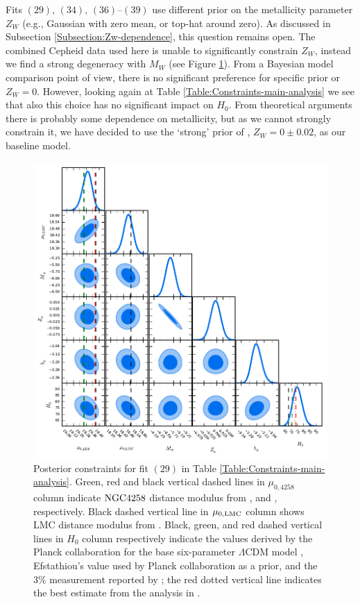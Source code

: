 Fits $(29),\,(34),\,(36)$--$(39)$ use different prior on the metallicity parameter $Z_W$ (e.g., Gaussian with zero mean, or top-hat around zero). 
As discussed in Subsection \ref{Subsection:Zw-dependence}, this question remains open. The combined Cepheid data used here is unable to significantly constrain $Z_W$, instead we find a strong degeneracy with $M_W$ (see Figure \ref{Fig:Main-analysis-fitM1a}). From a Bayesian model comparison point of view, there is no significant preference for specific prior or $Z_W=0$. However, looking again at Table \ref{Table:Constraints-main-analysis} we see that also this choice has no significant impact on $H_0$. From theoretical
arguments there is probably some dependence on metallicity, but as we cannot strongly constrain it, we have decided to use the `strong' prior of \cite{Efstathiou:2013via}, $Z_W = 0 \pm 0.02$, as our baseline model.

\begin{figure}[hbtp]
\centering
\includegraphics[width=\textwidth]{figures/chapter-h0/triangle_plot.pdf}
\caption{Posterior constraints for fit $(29)$ in Table \ref{Table:Constraints-main-analysis}. Green, red and black vertical dashed lines in $\mu_{0,4258}$ column indicate $\mathrm{NGC4258}$ distance modulus from \cite{Polshaw:2015ika}, \cite{Riess:2016jrr} and \cite{Humphreys:2013eja}, respectively. Black dashed vertical line in $\mu_{0,\mathrm{LMC}}$ column shows LMC distance modulus from \cite{Pietrzynski:2013gia}. Black, green, and red dashed vertical lines in $H_0$ column respectively indicate the values derived by the Planck collaboration for the base six-parameter $\Lambda$CDM model \cite{Ade:2015xua}, Efstathiou's value \cite{Efstathiou:2013via} used by Planck collaboration as a prior, and the $3\%$ measurement reported by \cite{Riess:2011yx}; the red dotted vertical line indicates the best estimate from the analysis in \cite{Riess:2016jrr}.   }
\label{Fig:Main-analysis-fitM1a}
\end{figure}


